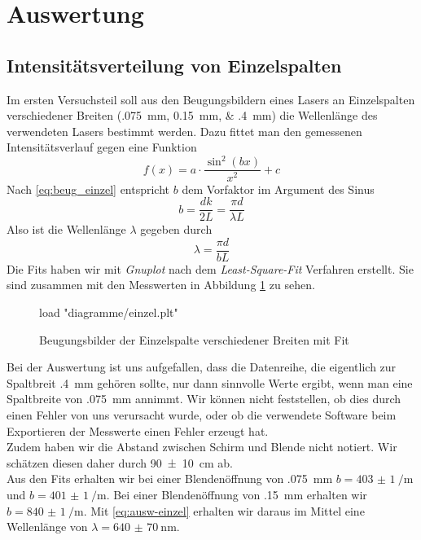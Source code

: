 \section{Auswertung}
\subsection{Intensitätsverteilung von Einzelspalten}
Im ersten Versuchsteil soll aus den Beugungsbildern eines Lasers an Einzelspalten verschiedener Breiten (\SIlist{,075;0,15; ,4}{\milli\meter}) die Wellenlänge des verwendeten Lasers bestimmt werden. Dazu fittet man den gemessenen Intensitätsverlauf gegen eine Funktion 
\begin{equation}
	f(x) = a \cdot \frac{\sin^2(bx)}{x^2} + c
\end{equation}
Nach \eqref{eq:beug_einzel} entspricht $ b $ dem Vorfaktor im Argument des Sinus 
\begin{equation}
	b = \frac{dk}{2L} = \frac{\pi d}{\lambda L}
\end{equation}
Also ist die Wellenlänge $ \lambda $ gegeben durch
\begin{equation}
	\lambda = \frac{\pi d}{bL} \label{eq:ausw-einzel}
\end{equation}
Die Fits haben wir mit \textit{Gnuplot} nach dem \textit{Least-Square-Fit} Verfahren erstellt. Sie sind zusammen mit den Messwerten in Abbildung \ref{fig:beug-einzel} zu sehen.
\begin{figure}[H]
	\centering
	\begin{gnuplot}[terminal=pdf, terminaloptions=color]
		load "diagramme/einzel.plt"
	\end{gnuplot}
	\caption{Beugungsbilder der Einzelspalte verschiedener Breiten mit Fit}
	\label{fig:beug-einzel}
\end{figure}
Bei der Auswertung ist uns aufgefallen, dass die Datenreihe, die eigentlich zur Spaltbreit \SI{,4}{\milli\meter} gehören sollte, nur dann sinnvolle Werte ergibt, wenn man eine Spaltbreite von \SI{,075}{\milli\meter} annimmt. Wir können nicht feststellen, ob dies durch einen Fehler von uns verursacht wurde, oder ob die verwendete Software beim Exportieren der Messwerte einen Fehler erzeugt hat.\\
Zudem haben wir die Abstand zwischen Schirm und Blende nicht notiert. Wir schätzen diesen daher durch \SI{90(10)}{\centi\meter} ab.\\
Aus den Fits erhalten wir bei einer Blendenöffnung von \SI{,075}{mm} $ b = \SI{403(1)}{\per\meter} $ und $ b = \SI{401(1)}{\per\meter} $. Bei einer Blendenöffnung von \SI{,15}{\milli\meter} erhalten wir $ b = \SI{840(1)}{\per\meter} $. Mit \eqref{eq:ausw-einzel} erhalten wir daraus im Mittel eine Wellenlänge von $ \lambda = \SI{640(70)}{\nano\meter} $.

